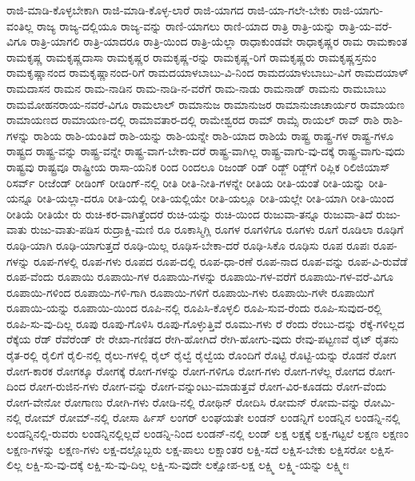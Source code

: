 {ರಾಜಿ-ಮಾಡಿ-ಕೊಳ್ಳಬೇಕಾಗಿ
ರಾಜಿ-ಮಾಡಿ-ಕೊಳ್ಳ-ಲಾರೆ
ರಾಜಿ-ಯಾಗದ
ರಾಜಿ-ಯಾ-ಗಲೇ-ಬೇಕು
ರಾಜಿ-ಯಾಗು-ವಂತಿಲ್ಲ
ರಾಜ್ಯ
ರಾಜ್ಯ-ದಲ್ಲಿಯೂ
ರಾಜ್ಯ-ವನ್ನು
ರಾಣಿ-ಯಾಗಲು
ರಾಣಿ-ಯಾದ
ರಾತ್ರಿ
ರಾತ್ರಿ-ಯನ್ನು
ರಾತ್ರಿ-ಯ-ವರೆ-ವಿಗೂ
ರಾತ್ರಿ-ಯಾಗಲಿ
ರಾತ್ರಿ-ಯಾದರೂ
ರಾತ್ರಿ-ಯಿಂದ
ರಾತ್ರಿ-ಯೆಲ್ಲಾ
ರಾಧಾಕುಂಡವೇ
ರಾಧಾಕೃಷ್ಣರ
ರಾಮ
ರಾಮಕಾಂತ
ರಾಮಕೃಷ್ಣ
ರಾಮಕೃಷ್ಣದಾಸಾ
ರಾಮಕೃಷ್ಣರ
ರಾಮಕೃಷ್ಣ-ರನ್ನು
ರಾಮಕೃಷ್ಣ-ರಿಗೆ
ರಾಮಕೃಷ್ಣರು
ರಾಮಕೃಷ್ಣಸ್ತನುಂ
ರಾಮಕೃಷ್ಣಾನಂದ
ರಾಮಕೃಷ್ಣಾನಂದ-ರಿಗೆ
ರಾಮದಯಾಳಬಾಬು-ವಿ-ನಿಂದ
ರಾಮದಯಾಳುಬಾಬು-ವಿಗೆ
ರಾಮದಯಾಳ್
ರಾಮದಾಸನ
ರಾಮನ
ರಾಮ-ನಾಡಿನ
ರಾಮ-ನಾಡಿ-ನ-ವರೆಗೆ
ರಾಮ-ನಾಡು
ರಾಮನಾಡ್
ರಾಮನು
ರಾಮಬಾಬು
ರಾಮಮೋಹನರಾಯ-ನವರೆ-ವಿಗೂ
ರಾಮಲಾಲ್
ರಾಮಾನುಜ
ರಾಮಾನುಜರ
ರಾಮಾನುಜಾಚಾರ್ಯರ
ರಾಮಾಯಣ
ರಾಮಾಯಣದ
ರಾಮಾಯಣ-ದಲ್ಲಿ
ರಾಮಾವತಾರ-ದಲ್ಲಿ
ರಾಮೇಶ್ವರದ
ರಾಮ್
ರಾಮ್ಸೆ
ರಾಯಲ್
ರಾವ್
ರಾಶಿ
ರಾಶಿ-ಗಳನ್ನು
ರಾಶಿಯ
ರಾಶಿ-ಯಂತಿದೆ
ರಾಶಿ-ಯನ್ನು
ರಾಶಿ-ಯನ್ನೇ
ರಾಶಿ-ಯಾದ
ರಾಶಿಯೆ
ರಾಷ್ಟ್ರ
ರಾಷ್ಟ್ರ-ಗಳ
ರಾಷ್ಟ್ರ-ಗಳೂ
ರಾಷ್ಟ್ರದ
ರಾಷ್ಟ್ರ-ವನ್ನು
ರಾಷ್ಟ್ರ-ವನ್ನೇ
ರಾಷ್ಟ್ರ-ವಾಗ-ಬೇಕಾ-ದರೆ
ರಾಷ್ಟ್ರ-ವಾಗಿಲ್ಲ
ರಾಷ್ಟ್ರ-ವಾಗು-ವು-ದಕ್ಕೆ
ರಾಷ್ಟ್ರ-ವಾಗು-ವುದು
ರಾಷ್ಟ್ರವು
ರಾಷ್ಟ್ರವೂ
ರಾಷ್ಟ್ರೀಯ
ರಾಸಾ-ಯನಿಕ
ರಿಂದ
ರಿಂದಲೂ
ರಿಜಂಡ್
ರಿಡ್
ರಿಡ್ಜ್
ರಿಡ್ಜ್‌ಗೆ
ರಿಪ್ಲಿಕ
ರಿಲಿಜಿಯಾಸ್
ರಿಸರ್ವ್
ರೀಜೆಂಡ್
ರೀಡಿಂಗ್
ರೀಡಿಂಗ್‌-ನಲ್ಲಿ
ರೀತಿ
ರೀತಿ-ನೀತಿ-ಗಳನ್ನೇ
ರೀತಿಯ
ರೀತಿ-ಯಂತೆ
ರೀತಿ-ಯನ್ನು
ರೀತಿ-ಯನ್ನೂ
ರೀತಿ-ಯಲ್ಲಾ-ದರೂ
ರೀತಿ-ಯಲ್ಲಿ
ರೀತಿ-ಯಲ್ಲಿಯೇ
ರೀತಿ-ಯಲ್ಲೂ
ರೀತಿ-ಯಲ್ಲೇ
ರೀತಿ-ಯಾಗಿ
ರೀತಿ-ಯಿಂದ
ರೀತಿಯೆ
ರೀತಿಯೇ
ರು
ರುಚಿ-ಕರ-ವಾಗಿತ್ತೆಂದರೆ
ರುಚಿ-ಯನ್ನು
ರುಚಿ-ಯಿಂದ
ರುಜುವಾ-ತನ್ನೂ
ರುಜುವಾ-ತಿದೆ
ರುಜು-ವಾತು
ರುಜು-ವಾತು-ಪಡಿಸ
ರುದ್ರಾಕ್ಷಿ-ಮಣಿ
ರೂ
ರೂಕಾಸ್ಮಿಗ್ಲಿ
ರೂಗಳ
ರೂಗಳಿಗೂ
ರೂಗಳು
ರೂಗೆ
ರೂಡಿಲಾ
ರೂಢಿಗೆ
ರೂಢಿ-ಯಾಗಿ
ರೂಢಿ-ಯಾಗುತ್ತದೆ
ರೂಢಿ-ಯಿಲ್ಲ
ರೂಢಿಸ-ಬೇಕಾ-ದರೆ
ರೂಢಿ-ಸಿಕೊ
ರೂಢಿಸು
ರೂಪ
ರೂಪಃ
ರೂಪ-ಗಳನ್ನು
ರೂಪ-ಗಳಲ್ಲಿ
ರೂಪ-ಗಳು
ರೂಪದ
ರೂಪ-ದಲ್ಲಿ
ರೂಪ-ಧಾ-ರಣೆ
ರೂಪ-ನಾದ
ರೂಪ-ವನ್ನು
ರೂಪ-ವಿ-ರುವೆಡೆ
ರೂಪ-ವೆಂದು
ರೂಪಾಯಿ
ರೂಪಾಯಿ-ಗಳ
ರೂಪಾಯಿ-ಗಳನ್ನು
ರೂಪಾಯಿ-ಗಳ-ವರೆಗೆ
ರೂಪಾಯಿ-ಗಳ-ವರೆ-ವಿಗೂ
ರೂಪಾಯಿ-ಗಳಿಂದ
ರೂಪಾಯಿ-ಗಳಿ-ಗಾಗಿ
ರೂಪಾಯಿ-ಗಳಿಗೆ
ರೂಪಾಯಿ-ಗಳು
ರೂಪಾಯಿ-ಗಳೇ
ರೂಪಾಯಿಗೆ
ರೂಪಾಯಿ-ಯನ್ನು
ರೂಪಾಯಿ-ಯಿಂದ
ರೂಪಿ-ನಲ್ಲಿ
ರೂಪಿಸಿ-ಕೊಳ್ಳಲಿ
ರೂಪಿ-ಸುವ-ರೆಂದು
ರೂಪಿ-ಸುವುದ-ರಲ್ಲಿ
ರೂಪಿ-ಸು-ವು-ದಿಲ್ಲ
ರೂಪು
ರೂಪು-ಗೊಳಿಸಿ
ರೂಪು-ಗೊಳ್ಳುತ್ತಿವೆ
ರೂಮು-ಗಳು
ರೆ
ರೆಂದು
ರೆಂಬು-ದನ್ನು
ರೆಕ್ಕೆ-ಗಳಿಲ್ಲದ
ರೆಕ್ಕೆಯ
ರೆಡ್
ರೆವೆರೆಂಡ್
ರೇ
ರೇಖಾ-ಗಣಿತದ
ರೇಗಿ-ಹೋಗಿದೆ
ರೇಗಿ-ಹೋಗು-ವುದು
ರೇವು-ಪಟ್ಟಣವೆ
ರೈಟ್
ರೈತನು
ರೈತ-ರಲ್ಲಿ
ರೈಲಿಗೆ
ರೈಲಿ-ನಲ್ಲಿ
ರೈಲು-ಗಳಲ್ಲಿ
ರೈಲ್
ರೈಲ್ವೆ
ರೈಲ್ವೆಯ
ರೊಂದಿಗೆ
ರೊಟ್ಟಿ
ರೊಟ್ಟಿ-ಯನ್ನು
ರೊಡನೆ
ರೋಗ
ರೋಗ-ಕಾರಕ
ರೋಗಕ್ಕೂ
ರೋಗಕ್ಕೆ
ರೋಗ-ಗಳನ್ನು
ರೋಗ-ಗಳಿಗೂ
ರೋಗ-ಗಳು
ರೋಗ-ಗಳೆಲ್ಲ
ರೋಗದ
ರೋಗ-ದಿಂದ
ರೋಗ-ರುಜಿನ-ಗಳು
ರೋಗ-ವನ್ನು
ರೋಗ-ವನ್ನುಂಟು-ಮಾಡುತ್ತವೆ
ರೋಗ-ವಿರ-ಕೂಡದು
ರೋಗ-ವೆಂದು
ರೋಗ-ವೇನೋ
ರೋಗಾಣು
ರೋಗಿ-ಗಳು
ರೋಡಿ-ನಲ್ಲಿ
ರೋಥಿನ್
ರೋದಿಸಿ
ರೋಮನ್
ರೋಮ-ವನ್ನು
ರೋಮಿ-ನಲ್ಲಿ
ರೋಮ್
ರೋಮ್‌-ನಲ್ಲಿ
ರೋಸಾ
ರ್ಹಿಸ್
ಲಂಗರ್‌
ಲಂಘಯತೇ
ಲಂಡನ್
ಲಂಡನ್ನಿಗೆ
ಲಂಡನ್ನಿನ
ಲಂಡನ್ನಿ-ನಲ್ಲಿ
ಲಂಡನ್ನಿನಲ್ಲಿ-ರುವರು
ಲಂಡನ್ನಿನಲ್ಲಿಲ್ಲದೆ
ಲಂಡನ್ನಿ-ನಿಂದ
ಲಂಡನ್‌-ನಲ್ಲಿ
ಲಂಡ್
ಲಕ್ಷ
ಲಕ್ಷಕ್ಕೆ
ಲಕ್ಷ-ಗಟ್ಟಲೆ
ಲಕ್ಷಣ
ಲಕ್ಷಣಂ
ಲಕ್ಷಣ-ಗಳನ್ನು
ಲಕ್ಷಣ-ಗಳು
ಲಕ್ಷ-ದಲ್ಲೊಬ್ಬರು
ಲಕ್ಷ-ಪಾಲು
ಲಕ್ಷಾಂತರ
ಲಕ್ಷಿ-ಸದೆ
ಲಕ್ಷಿಸ-ಬೇಕು
ಲಕ್ಷಿಸರೋ
ಲಕ್ಷಿಸ-ಲಿಲ್ಲ
ಲಕ್ಷಿ-ಸು-ವು-ದಕ್ಕೆ
ಲಕ್ಷಿ-ಸು-ವು-ದಿಲ್ಲ
ಲಕ್ಷಿ-ಸು-ವುದೇ
ಲಕ್ಷೋಪ-ಲಕ್ಷ
ಲಕ್ಷ್ಮಿ
ಲಕ್ಷ್ಮಿ-ಯನ್ನು
ಲಕ್ಷ್ಮೀಃ
}
